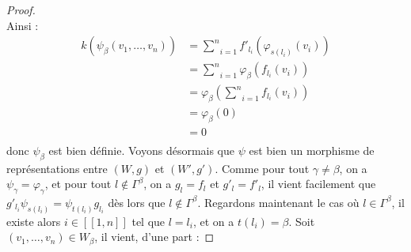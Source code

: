 \documentclass[a4paper,10pt]{article}
\begin{document}
\begin{proof}
\[	\]
Ainsi :
\[
\begin{array}{rl}
	k(\psi_{\beta}(v_{1},\dots,v_{n})) & = \underset{i=1}{\overset{n}{\sum}}f'_{l_{i}}(\varphi_{s(l_{i})}(v_{i})) \\ 
	& = \underset{i=1}{\overset{n}{\sum}} \varphi_{\beta}(f_{l_{i}}(v_{i}))\\
	& = \varphi_{\beta}(\underset{i=1}{\overset{n}{\sum}}f_{l_{i}}(v_{i}))\\
	& = \varphi_{\beta}(0) \\
	& = 0 \\
\end{array}
\]
donc $\psi_{\beta}$ est bien définie. Voyons désormais que $\psi$ est bien un morphisme de représentations entre $(W,g)$ et $(W',g')$. Comme pour tout $\gamma\neq\beta$, on a $\psi_{\gamma}=\varphi_{\gamma}$, et pour tout $l\notin\Gamma^{\beta}$, on a $g_{l}=f_{l}$ et $g'_{l}=f'_{l}$, il vient facilement que $g'_{l_{i}}\psi_{s(l_{i})}=\psi_{t(l_{i})}g_{l_{i}}$ dès lors que $l\notin\Gamma^{\beta}$. Regardons maintenant le cas où $l\in\Gamma^{\beta}$, il existe alors $i\in[\![1,n]\!]$ tel que $l=l_{i}$, et on a $t(l_{i})=\beta$. Soit $(v_{1},\dots,v_{n})\in W_{\beta}$, il vient, d'une part :


\end{proof}
\end{document}
